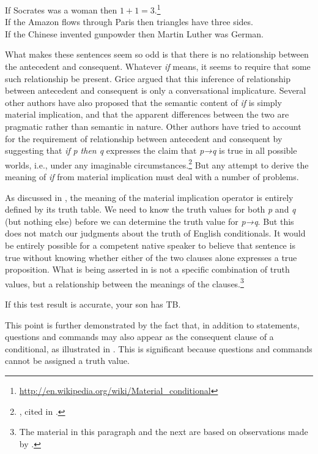 \ea \label{ex:19.21}
\ea  If Socrates was a woman then $1+1=3$.\footnote{\url{http://en.wikipedia.org/wiki/Material_conditional}} \\
\ex If the Amazon flows through Paris then triangles have three sides.\\
\ex If the  {Chinese} invented gunpowder then Martin Luther was  {German}.
                       \z
\z


What makes these sentences seem so odd is that there is no relationship between the antecedent and consequent. Whatever \textit{if} means, it seems to require that some such relationship be present. Grice argued that this inference of relationship between antecedent and consequent is only a conversational implicature. Several other authors have also proposed that the semantic content of \textit{if} is simply material implication, and that the apparent differences between the two are pragmatic rather than semantic in nature. Other authors have tried to account for the requirement of relationship between antecedent and consequent by suggesting that \textit{if} \textit{p then q} expresses the claim that \textit{p→q} is true in all possible worlds, i.e., under any imaginable circumstances.\footnote{\citet{Lewis1918}, cited in \citet{vonFintel2011}.} But any attempt to derive the meaning of \textit{if} from material implication must deal with a number of problems.



As discussed in , the meaning of the material implication operator is entirely defined by its truth table. We need to know the truth values for both \textit{p} and \textit{q} (but nothing else) before we can determine the truth value for \textit{p→q}. But this does not match our judgments about the truth of English conditionals. It would be entirely possible for a competent native speaker to believe that sentence  is true without knowing whether either of the two clauses alone expresses a true proposition. What is being asserted in  is not a specific combination of truth values, but a relationship between the meanings of the clauses.\footnote{The material in this paragraph and the next are based on observations made by \citet{Podlesskaya2001}.}


\ea \label{ex:19.22}
If this test result is accurate, your son has TB.
\z


This point is further demonstrated by the fact that, in addition to statements, questions and commands may also appear as the consequent clause of a conditional, as illustrated in . This is significant because questions and commands cannot be assigned a truth value.


